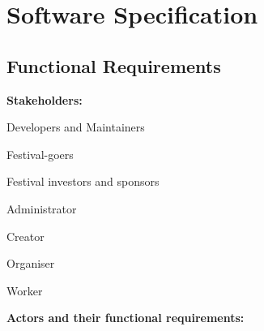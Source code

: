 \chapter{Software Specification}
		
	\section{Functional Requirements}
			
			\noindent \textbf{Stakeholders:}
			
			\begin{packed_enum}
				
				\item Developers and Maintainers
				\item Festival-goers
				\item Festival investors and sponsors
				\item Administrator			
				\item Creator
				\item Organiser
				\item Worker
				
			\end{packed_enum}
			
			\noindent \textbf{Actors and their functional requirements:}
			
